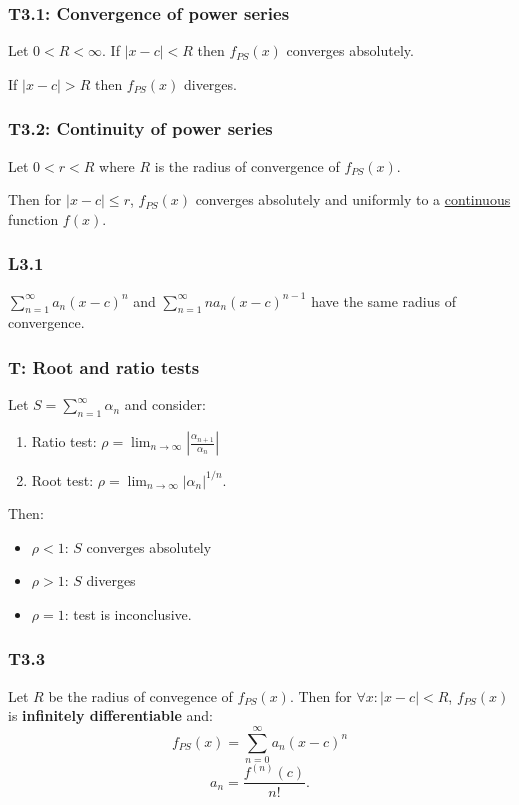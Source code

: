 \documentclass{article}
\begin{document}
\begin{multicols*}{3}
\subsubsection*{T3.1: Convergence of power series}
Let $0<R<\infty$.
If $|x-c|<R$ then
$f_{PS}(x)$ converges absolutely.

If $|x-c|>R$ then $f_{PS}(x)$ diverges.

\subsubsection*{T3.2: Continuity of power series}
Let $0<r<R$ where $R$ is the radius of
convergence of $f_{PS}(x)$.

Then for $|x-c|\leq r$, $f_{PS}(x)$
converges absolutely and uniformly
to a \underline{continuous} function $f(x)$.

\subsubsection*{L3.1}
$\displaystyle\sum_{n=1}^{\infty}a_n(x-c)^n$
and $\displaystyle\sum_{n=1}^{\infty}n a_n(x-c)^{n-1}$
have the same radius of convergence.

\subsubsection*{T: Root and ratio tests}
Let $\displaystyle S=\sum_{n=1}^{\infty}\alpha_n$
and consider:
\begin{enumerate}
    \item Ratio test: $\displaystyle\rho=\lim_{n\rightarrow\infty}
    \left|\frac{\alpha_{n+1}}{\alpha_n}\right|$

    \item Root test: $\displaystyle\rho=
    \lim_{n\rightarrow\infty}|\alpha_n|^{1/n}$.
\end{enumerate}
Then:
\begin{itemize}
    \item $\rho<1$: $S$ converges absolutely
    \item $\rho>1$: $S$ diverges
    \item $\rho=1$: test is inconclusive.
\end{itemize}

\subsubsection*{T3.3}
Let $R$ be the radius of convegence of
$f_{PS}(x)$. Then for $\forall x:|x-c|<R$,
$f_{PS}(x)$ is \textbf{infinitely differentiable} and:
$$f_{PS}(x)=\sum_{n=0}^{\infty}a_n(x-c)^n$$
$$a_n=\frac{f^{(n)}(c)}{n!}.$$


\end{multicols*}
\end{document}
